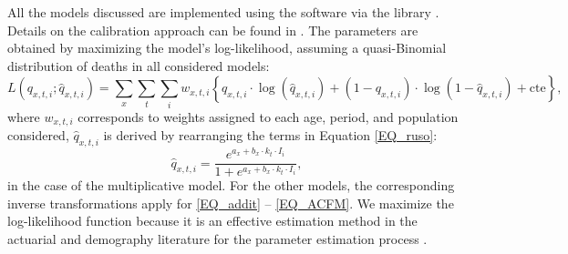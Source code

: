 All the models discussed are implemented using the software \citet{R2022} via the  library \citep{Turner2023}. Details on the calibration approach can be found in \citet{Debon2011}. The parameters are obtained by maximizing the model's log-likelihood, assuming a quasi-Binomial distribution of deaths in all considered models:
\begin{equation}
L\left( q_{x,t,i}; \hat{q}_{x,t,i}\right) = \sum_{x} \sum_{t} \sum_{i} w_{x,t,i} \left\lbrace q_{x,t,i} \cdot \log \left( \hat{q}_{x,t,i}\right) + \left(1 - q_{x,t,i}\right) \cdot \log\left(1-\hat{q}_{x,t,i}\right) + \textrm{cte} \right\rbrace,
\end{equation}
where $w_{x,t,i}$ corresponds to weights assigned to each age, period, and population considered, $\hat{q}_{x,t,i}$ is derived by rearranging the terms in Equation \eqref{EQ_ruso}:
\begin{equation}
\hat{q}_{x,t,i} = \frac{e^{a_x + b_x \cdot k_t \cdot I_i}}{1+e^{a_x + b_x \cdot k_t \cdot I_i}},
\end{equation}
in the case of the multiplicative model. For the other models, the corresponding inverse transformations apply for \eqref{EQ_addit} -- \eqref{EQ_ACFM}. We maximize the log-likelihood function because it is an effective estimation method in the actuarial and demography literature for the parameter estimation process \citep{Brouhns2002, Renshaw2006, Cairns2009}.

